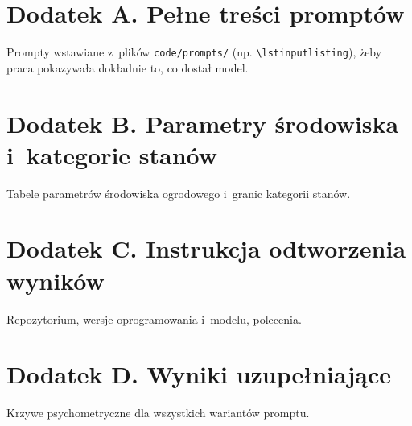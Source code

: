 
\chapter*{Dodatek A. Pełne treści promptów}
\label{app:a}

\begin{planroboczy}
Prompty wstawiane z~plików \texttt{code/prompts/} (np. \texttt{\textbackslash lstinputlisting}), żeby praca pokazywała dokładnie to, co dostał model.
\end{planroboczy}

\cleardoublepage
\chapter*{Dodatek B. Parametry środowiska i~kategorie stanów}
\label{app:b}

\begin{planroboczy}
Tabele parametrów środowiska ogrodowego i~granic kategorii stanów.
\end{planroboczy}

\cleardoublepage
\chapter*{Dodatek C. Instrukcja odtworzenia wyników}
\label{app:c}

\begin{planroboczy}
Repozytorium, wersje oprogramowania i~modelu, polecenia.
\end{planroboczy}

\cleardoublepage
\chapter*{Dodatek D. Wyniki uzupełniające}
\label{app:d}

\begin{planroboczy}
Krzywe psychometryczne dla wszystkich wariantów promptu.
\end{planroboczy}
